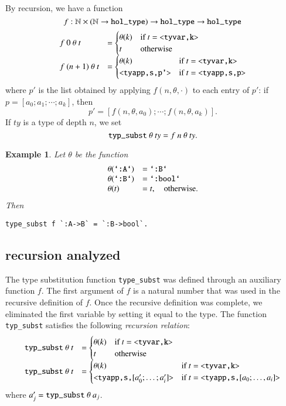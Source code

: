 \documentclass[cup9a]{cupbook}
\newtheorem{example}{Example}[chapter]
\begin{document}
By recursion, we have a function 
$$f:\ring{N}\times (\ring{N}\to \verb!hol_type!)\to \verb!hol_type! \to \verb!hol_type!$$
$$
\begin{array}{lll}
f~0~\theta~t &=\begin{cases} \theta(k) &\hbox{if } t = \verb!<tyvar,k>!\\ t &\hbox{otherwise}\end{cases}\\
f~(n+1)~\theta~t &=\begin{cases} \theta(k) &\hbox{if } t = \verb!<tyvar,k>!\\ \verb!<tyapp,s,p'>! &\hbox{if } t = \verb!<tyapp,s,p>!\end{cases}\\
\end{array}
$$
where $p'$ is the list obtained by applying $f(n,\theta,\cdot)$ to each entry of $p'$:
if $p=[a_0;a_1;\cdots;a_k]$, then
$$
p' = [f(n,\theta,a_0);\cdots;f(n,\theta,a_k)].
$$
If $ty$ is a type of depth $n$, we set
\begin{equation}
\verb!typ_subst!~\theta~ty = f~n~\theta~ty.
\end{equation}

\begin{example}
Let $\theta$ be the function
$$
\begin{array}{lll}
\theta(\verb!`:A`!) &=\verb!`:B`!\\
\theta(\verb!`:B`!) &=\verb!`:bool`!\\
\theta(t) &= t,\quad\hbox{otherwise}.
\end{array}
$$
Then
\begin{verbatim}
type_subst f `:A->B` = `:B->bool`.
\end{verbatim}
\end{example}

\subsection{recursion analyzed}

The type substitution function \verb!type_subst! was defined through an auxiliary function $f$.  The first
argument of $f$ is a natural number that was used in the recursive definition of $f$.  Once the recursive definition was complete, we eliminated the first variable by setting it equal to the type.  The function \verb!typ_subst! satisfies the following {\it recursion relation}:
$$
\begin{array}{lll}
\verb!typ_subst!~\theta~t &=\begin{cases} \theta(k) &\hbox{if } t = \verb!<tyvar,k>!\\ t &\hbox{otherwise}\end{cases}\\
\verb!typ_subst!~\theta~t &=\begin{cases} \theta(k) &\hbox{if } t = \verb!<tyvar,k>!\\ \verb!<tyapp,s,![a'_0;\ldots;a'_i]\verb!>! &\hbox{if } t = \verb!<tyapp,s,![a_0;\ldots,a_i]\verb!>!\end{cases}\\
\end{array}
$$
where $a'_j = \verb!typ_subst!~\theta~a_j$.
\end{document}
